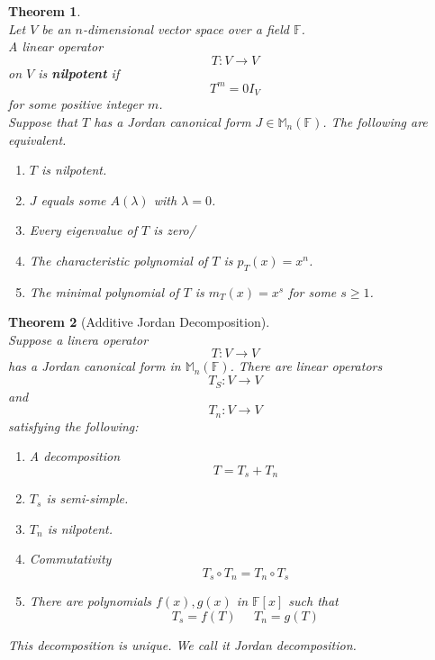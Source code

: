 \documentclass[12pt]{article}
\newtheorem{theorem}{Theorem}[section]
\theoremstyle{definition}
\begin{document}
\begin{theorem}\hfill\\\normalfont Let $V$ be an $n$-dimensional vector space over a field $\mathbb{F}$.\\A linear operator 
\[
T:V\to V
\]
on $V$ is \textbf{nilpotent} if
\[
T^m=0I_V
\]
for some positive integer $m$.\\
Suppose that $T$ has a Jordan canonical form $J\in\mathbb{M}_n(\mathbb{F})$. The following are equivalent.
\begin{enumerate}[label=(\arabic*)]
\item $T$ is nilpotent.
\item $J$ equals some $A(\lambda)$ with $\lambda=0$.
\item Every eigenvalue of $T$ is zero/
\item The characteristic polynomial of $T$ is $p_T(x)=x^n$.
\item The minimal polynomial of $T$ is $m_T(x)=x^s$ for some $s\geq 1$.
\end{enumerate}
\end{theorem}
\begin{theorem}[Additive Jordan Decomposition]
\hfill\\\normalfont Suppose a linera operator 
\[
T:V\to V
\]
has a Jordan canonical form in $\mathbb{M}_n(\mathbb{F})$. There are linear operators
\[
T_S:V\to V
\]
and
\[
T_n:V\to V
\]
satisfying the following:
\begin{enumerate}[label=(\arabic*)]
\item A decomposition
\[
T=T_s+T_n
\]
\item $T_s$ is semi-simple.
\item $T_n$ is nilpotent.
\item Commutativity
\[
T_s\circ T_n  = T_n\circ T_s
\]
\item  There are polynomials $f(x),g(x)$ in $\mathbb{F}[x]$ such that
\[
T_s=f(T)\;\;\;\;\;T_n=g(T)
\]
\end{enumerate}
This decomposition is unique. We call it Jordan decomposition.
\end{theorem}
\clearpage
\end{document}
